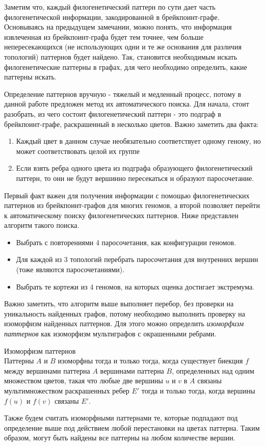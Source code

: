 Заметим что, каждый филогенетический паттерн по сути дает часть филогенетической информации, закодированной в брейкпоинт-графе.
Основываясь на предыдущем замечании, можно понять, что информация извлеченная из брейкпоинт-графа будет тем точнее,
чем больше непересекающихся (не использующих одни и те же основания для различия топологий) паттернов будет найдено.
Так, становится необходимым искать филогенетические паттерны в графах, для чего необходимо определить, какие паттерны искать.

Определение паттернов вручную - тяжелый и медленный процесс, потому в данной работе предложен метод их автоматического поиска.
Для начала, стоит разобрать, из чего состоит филогенетический паттерн - это подграф в брейкпоинт-графе, раскрашенный в несколько цветов.
Важно заметить два факта:
\begin{enumerate}
  \item Каждый цвет в данном случае необязательно соответствует одному геному, но может соответствовать целой их группе
  \item Если взять ребра одного цвета из подграфа образующего филогенетический паттерн, то они не будут вершинно пересекаться и образуют паросочетание.
\end{enumerate}

Первый факт важен для получения информации с помощью филогенетических паттернов из брейкпоинт-графов для многих геномов,
а второй позволяет перейти к автоматическому поиску филогенетических паттернов.
Ниже представлен алгоритм такого поиска.
\begin{itemize}
  \item Выбрать с повторениями 4 паросочетания, как конфигурации геномов.
  \item Для каждой из 3 топологий перебрать паросочетания для внутренних вершин (тоже являются паросочетаниями).
  \item Выбрать те кортежи из 4 геномов, на которых оценка достигает экстремума.
\end{itemize}

Важно заметить, что алгоритм выше выполняет перебор, без проверки на уникальность найденных графов, потому необходимо выполнить проверку на изоморфизм найденных паттернов.
Для этого можно определить \textit{изоморфизм паттернов} как изоморфизм мультиграфов с окрашенными ребрами.
\begin{define}{Изоморфизм паттернов} \\
  Паттерны $A$ и $B$ изоморфны тогда и только тогда, когда существует биекция $f$ между вершинами паттерна $A$ вершинами паттерна $B$,
  определенных над одним множеством цветов,
  такая что любые две вершины $u$ и $v$ в $A$ связаны мультимножеством раскрашенных ребер $E'$ тогда и только тогда, когда вершины
  $f(u)$ и $f(v)$ связаны $E'$.
\end{define}
Также будем считать изоморфными паттернами те, которые подпадают под определение выше под действием любой перестановки на цветах паттерна.
Таким образом, могут быть найдены все паттерны на любом количестве вершин.

